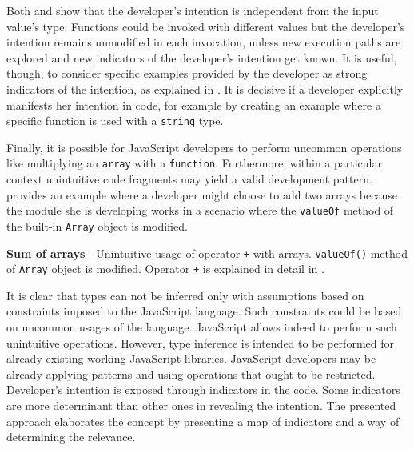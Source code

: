 Both  and  show that the developer's intention is independent from the input value's type. Functions could be invoked with different values but the developer's intention remains unmodified in each invocation, unless new execution paths are explored and new indicators of the developer's intention get known. It is useful, though, to consider specific examples provided by the developer as strong indicators of the intention, as explained in . It is decisive if a developer explicitly manifests her intention in code, for example by creating an example where a specific function is used with a \texttt{string} type.

Finally, it is possible for JavaScript developers to perform uncommon operations like multiplying an \texttt{array} with a \texttt{function}. Furthermore, within a particular context unintuitive code fragments may yield a valid development pattern.  provides an example where a developer might choose to add two arrays because the module she is developing works in a scenario where the \texttt{valueOf} method of the built-in \texttt{Array} object is modified.

\begin{code}
  \captionsetup{aboveskip=0pt, belowskip=10pt}
  \caption[Sum of arrays]{\textbf{Sum of arrays} - Unintuitive usage of operator \texttt{+} with arrays. \texttt{valueOf()} method of \texttt{Array} object is modified. Operator \texttt{+} is explained in detail in .}
  \label{code:type-inference-value-of-method-modified}
\end{code}

It is clear that types can not be inferred only with assumptions based on constraints imposed to the JavaScript language. Such constraints could be based on uncommon usages of the language. JavaScript allows indeed to perform such unintuitive operations. However, type inference is intended to be performed for already existing working JavaScript libraries. JavaScript developers may be already applying patterns and using operations that ought to be restricted. Developer's intention is exposed through indicators in the code. Some indicators are more determinant than other ones in revealing the intention. The presented approach elaborates the concept by presenting a map of indicators and a way of determining the relevance.

